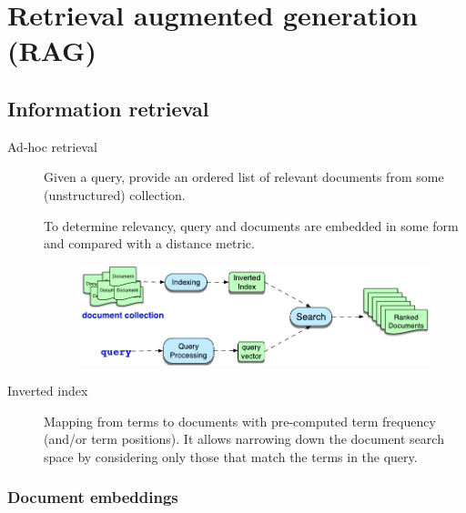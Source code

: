 \chapter{Retrieval augmented generation (RAG)}



\section{Information retrieval}

\begin{description}
    \item[Ad-hoc retrieval] 
        Given a query, provide an ordered list of relevant documents from some (unstructured) collection.

        To determine relevancy, query and documents are embedded in some form and compared with a distance metric.

        \begin{figure}[H]
            \centering
            \includegraphics[width=0.75\linewidth]{./img/_info_retrieval.pdf}
        \end{figure}

    \item[Inverted index] 
        Mapping from terms to documents with pre-computed term frequency (and/or term positions). It allows narrowing down the document search space by considering only those that match the terms in the query.
\end{description}


\subsection{Document embeddings}

